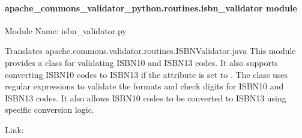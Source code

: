 \documentclass[letterpaper,10pt,english]{sphinxmanual}
\begin{document}
\paragraph{apache\_commons\_validator\_python.routines.isbn\_validator module}
\label{\detokenize{apache_commons_validator_python.routines:module-apache_commons_validator_python.routines.isbn_validator}}\label{\detokenize{apache_commons_validator_python.routines:apache-commons-validator-python-routines-isbn-validator-module}}
\sphinxAtStartPar
Module Name: isbn\_validator.py
\begin{description}
\sphinxAtStartPar
Translates apache.commons.validator.routines.ISBNValidator.java
This module provides a class  for validating ISBN\sphinxhyphen{}10 and ISBN\sphinxhyphen{}13 codes.
It also supports converting ISBN\sphinxhyphen{}10 codes to ISBN\sphinxhyphen{}13 if the  attribute is set to .
The class uses regular expressions to validate the formats and check digits for ISBN\sphinxhyphen{}10 and ISBN\sphinxhyphen{}13 codes.
It also allows ISBN\sphinxhyphen{}10 codes to be converted to ISBN\sphinxhyphen{}13 using specific conversion logic.

\end{description}

\sphinxAtStartPar
Link: 
\end{document}
